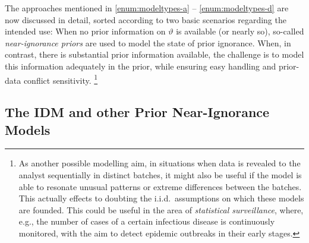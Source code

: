 The approaches mentioned in \eqref{enum:modeltypes-a} -- \eqref{enum:modeltypes-d} are now discussed in detail,
sorted according to two basic scenarios regarding the intended use:
When no prior information on $\vartheta$ is available (or nearly so),
so-called \emph{near-ignorance priors} are used to model the state of prior ignorance.
When, in contrast, there is substantial prior information available,
the challenge is to model this information adequately in the prior,
while ensuring easy handling and prior-data conflict sensitivity.%
\footnote{\label{foot:sequential}As another possible modelling aim,
in situations when data is revealed to the analyst sequentially in distinct batches,
it might also be useful if the model is able to resonate unusual patterns or extreme differences between the batches.
This actually effects to doubting the i.i.d.\ assumptions on which these models are founded.
This could be useful in the area of \emph{statistical surveillance},
where, e.g., the number of cases of a certain infectious disease is continuously monitored,
with the aim to detect epidemic outbreaks in their early stages.}


\subsection{The IDM and other Prior Near-Ignorance Models}
\label{sec:idm-and-near-ignorance}

